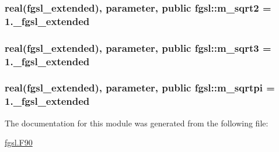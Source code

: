 \hypertarget{classfgsl_a7d0e2199519f7100527499e3c206fc31}{
\subsubsection[{m\-\_\-sqrt2}]{\setlength{\rightskip}{0pt plus 5cm}real({\bf fgsl\-\_\-extended}), parameter, public fgsl\-::m\-\_\-sqrt2 = 1.\-\_\-fgsl\-\_\-extended}}\label{classfgsl_a7d0e2199519f7100527499e3c206fc31}
\hypertarget{classfgsl_acdd93c47924b7382b9ab00728cc46b9f}{
\subsubsection[{m\-\_\-sqrt3}]{\setlength{\rightskip}{0pt plus 5cm}real({\bf fgsl\-\_\-extended}), parameter, public fgsl\-::m\-\_\-sqrt3 = 1.\-\_\-fgsl\-\_\-extended}}\label{classfgsl_acdd93c47924b7382b9ab00728cc46b9f}
\hypertarget{classfgsl_aa32be73a066aea0217a624284ae34c39}{
\subsubsection[{m\-\_\-sqrtpi}]{\setlength{\rightskip}{0pt plus 5cm}real({\bf fgsl\-\_\-extended}), parameter, public fgsl\-::m\-\_\-sqrtpi = 1.\-\_\-fgsl\-\_\-extended}}\label{classfgsl_aa32be73a066aea0217a624284ae34c39}


The documentation for this module was generated from the following file\-:\begin{DoxyCompactItemize}
\item 
\hyperlink{fgsl_8F90}{fgsl.\-F90}\end{DoxyCompactItemize}

